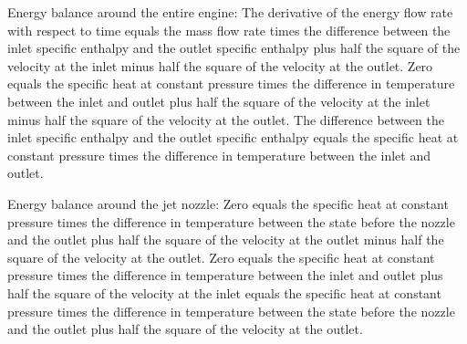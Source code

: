 Energy balance around the entire engine:
The derivative of the energy flow rate with respect to time equals the mass flow rate times the difference between the inlet specific enthalpy and the outlet specific enthalpy plus half the square of the velocity at the inlet minus half the square of the velocity at the outlet.
Zero equals the specific heat at constant pressure times the difference in temperature between the inlet and outlet plus half the square of the velocity at the inlet minus half the square of the velocity at the outlet.
The difference between the inlet specific enthalpy and the outlet specific enthalpy equals the specific heat at constant pressure times the difference in temperature between the inlet and outlet.

Energy balance around the jet nozzle:
Zero equals the specific heat at constant pressure times the difference in temperature between the state before the nozzle and the outlet plus half the square of the velocity at the outlet minus half the square of the velocity at the outlet.
Zero equals the specific heat at constant pressure times the difference in temperature between the inlet and outlet plus half the square of the velocity at the inlet equals the specific heat at constant pressure times the difference in temperature between the state before the nozzle and the outlet plus half the square of the velocity at the outlet.
